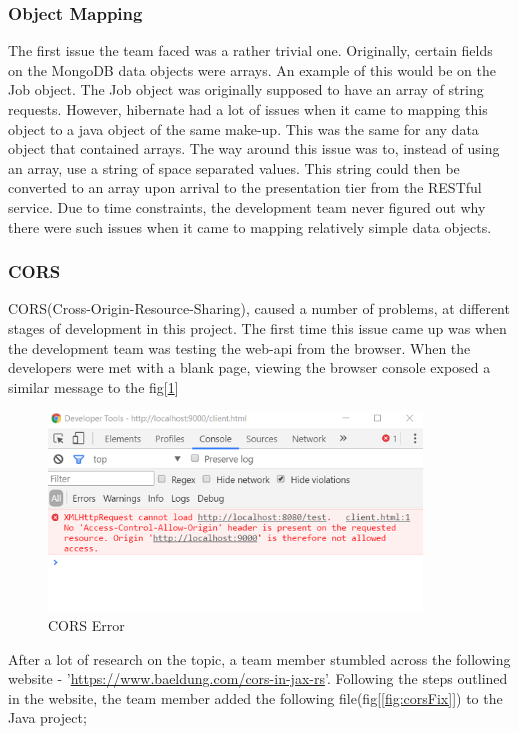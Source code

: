 \subsubsection{Object Mapping}
\label{sec:SystemEvaluationObjectMapping}
The first issue the team faced was a rather trivial one. Originally, certain fields on the MongoDB data objects were arrays. An example of this would be on the Job object. The Job object was originally supposed to have an array of string requests. However, hibernate had a lot of issues when it came to mapping this object to a java object of the same make-up.  This was the same for any data object that contained arrays. The way around this issue was to, instead of using an array, use a string of space separated values. This string could then be converted to an array upon arrival to the presentation tier from the RESTful service. Due to time constraints, the development team never figured out why there were such issues when it came to mapping relatively simple data objects.

\subsubsection{CORS}
\label{sec:SystemEvaluationCORS}
CORS(Cross-Origin-Resource-Sharing), caused a number of problems, at different stages of development in this project. The first time this issue came up was when the development team was testing the web-api from the browser. When the developers were met with a blank page, viewing the browser console exposed a similar message to the fig[\ref{fig:cors}]

\begin{figure}[H]
    \centering
    \includegraphics[width=\textwidth, height=150pt]{img/CORS.PNG}
    \caption{CORS Error}
    \label{fig:cors}
\end{figure}

\bigskip

After a lot of research on the topic, a team member stumbled across the following website - '\href{https://www.baeldung.com/cors-in-jax-rs}{https://www.baeldung.com/cors-in-jax-rs}'. Following the steps outlined in the website, the team member added the following file(fig[\ref{fig:corsFix}]) to the Java project;

